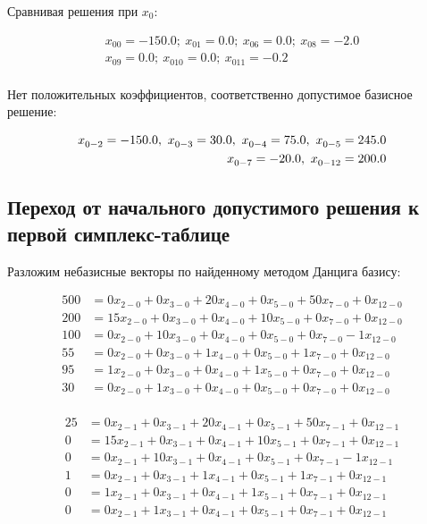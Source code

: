 Сравнивая решения при $x_0$:

\vspace{-\baselineskip}\begin{align*}
	x_{00} = -150.0;\ x_{01} = 0.0;\ x_{06} = 0.0;\ x_{08} = -2.0\\ 
	x_{09} = 0.0;\ x_{010} = 0.0;\ x_{011} = -0.2\\
\end{align*}

Нет положительных коэффициентов, соответственно допустимое базисное решение:

\vspace{-\baselineskip}\begin{align*}
x_{0-2}^{\*} = -150.0,\ x_{0-3}^{\*} = 30.0,\ x_{0-4}^{\*} = 75.0,\ x_{0-5}^{\*} = 245.0\\ 
	x_{0-7}^{\*} = -20.0,\ x_{0-12}^{\*} = 200.0
\end{align*}

\subsection{Переход от начального допустимого решения к первой симплекс-таблице}

Разложим небазисные векторы по найденному методом Данцига базису:

\small

\vspace{-\baselineskip}\begin{align*}
500 &= 0x_{2-0}+0x_{3-0}+20x_{4-0}+0x_{5-0}+50x_{7-0}+0x_{12-0} \\ 
	200 &= 15x_{2-0}+0x_{3-0}+0x_{4-0}+10x_{5-0}+0x_{7-0}+0x_{12-0} \\ 
	100 &= 0x_{2-0}+10x_{3-0}+0x_{4-0}+0x_{5-0}+0x_{7-0}-1x_{12-0} \\ 
	55 &= 0x_{2-0}+0x_{3-0}+1x_{4-0}+0x_{5-0}+1x_{7-0}+0x_{12-0} \\ 
	95 &= 1x_{2-0}+0x_{3-0}+0x_{4-0}+1x_{5-0}+0x_{7-0}+0x_{12-0} \\ 
	30 &= 0x_{2-0}+1x_{3-0}+0x_{4-0}+0x_{5-0}+0x_{7-0}+0x_{12-0} \\
\end{align*}

\vspace{-\baselineskip}\begin{align*}
25 &= 0x_{2-1}+0x_{3-1}+20x_{4-1}+0x_{5-1}+50x_{7-1}+0x_{12-1} \\ 
	0 &= 15x_{2-1}+0x_{3-1}+0x_{4-1}+10x_{5-1}+0x_{7-1}+0x_{12-1} \\ 
	0 &= 0x_{2-1}+10x_{3-1}+0x_{4-1}+0x_{5-1}+0x_{7-1}-1x_{12-1} \\ 
	1 &= 0x_{2-1}+0x_{3-1}+1x_{4-1}+0x_{5-1}+1x_{7-1}+0x_{12-1} \\ 
	0 &= 1x_{2-1}+0x_{3-1}+0x_{4-1}+1x_{5-1}+0x_{7-1}+0x_{12-1} \\ 
	0 &= 0x_{2-1}+1x_{3-1}+0x_{4-1}+0x_{5-1}+0x_{7-1}+0x_{12-1} \\
\end{align*}

